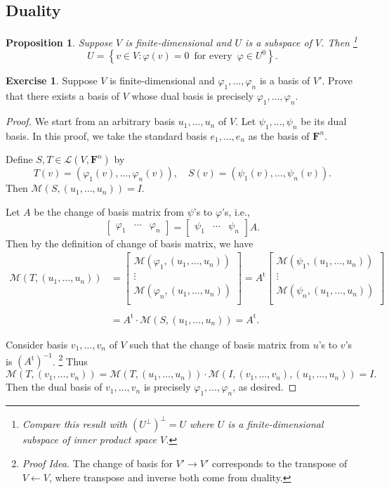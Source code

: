 \documentclass[nofonts,colorlinks]{tufte-handout}
\theoremstyle{plain} %
\newtheorem{prop}[thm]{Proposition}
\theoremstyle{definition}
\newtheorem{exer}[thm]{Exercise}
\theoremstyle{remark}
\def\idea{\textit{\color[rgb]{0,0,.55}Proof Idea. }}
\newcommand{\bra}[1]{\mathopen{}\left(#1\right)}
\newcommand{\cbra}[1]{\mathopen{}\left\{#1\right\}}
\renewcommand{\phi}{\varphi}
\newcommand{\F}{\mathbf{F}}
\renewcommand{\L}{\mathcal{L}}
\newcommand{\M}{\mathcal{M}}
\renewcommand{\intercal}{\mathrm{t}}
\begin{document}
\subsection{Duality}
\begin{prop}\label{prop: relation between subspace and annihilator}
	Suppose $V$ is finite-dimensional and $U$ is a subspace of $V$. Then%
	\footnote{Compare this result with $\bra{U^\perp}^\perp=U$ where $U$ is a finite-dimensional subspace of inner product space $V$.}
	\[U=\cbra{v\in V:\phi(v)=0\,\text{ for every }\,\phi\in U^0}.\]
\end{prop}

\begin{exer}
	Suppose $V$ is finite-dimensional and $\phi_1,\dots,\phi_n$ is a basis of $V'$. Prove that there exists a basis of $V$ whose dual basis is precisely $\phi_1,\dots,\phi_n$.
\end{exer}
\begin{proof}
	We start from an arbitrary basis $u_1,\dots,u_n$ of $V$. Let $\psi_1,\dots,\psi_n$ be its dual basis. In this proof, we take the standard basis $e_1,\dots,e_n$ as the basis of $\F^n$.
	
	Define $S,T\in\L\bra{V,\F^n}$ by
	\[T(v)=\bra{\phi_1(v),\dots,\phi_n(v)},\quad S(v)=\bra{\psi_1(v),\dots,\psi_n(v)}.\]
	Then $\M\bra{S,\bra{u_1,\dots,u_n}}=I$.
	
	Let $A$ be the change of basis matrix from $\psi$'s to $\phi$'s, i.e.,
	\[\begin{bmatrix}\phi_1&\cdots&\phi_n\end{bmatrix}=\begin{bmatrix}\psi_1&\cdots&\psi_n\end{bmatrix}A.\]
	Then by the definition of change of basis matrix, we have
	\begin{align*}
		\M\bra{T,\bra{u_1,\dots,u_n}}&=\begin{bmatrix}
			\M\bra{\phi_1,\bra{u_1,\dots,u_n}}\\
			\vdots\\
			\M\bra{\phi_n,\bra{u_1,\dots,u_n}}\\
		\end{bmatrix}
		=A^\intercal\begin{bmatrix}
			\M\bra{\psi_1,\bra{u_1,\dots,u_n}}\\
			\vdots\\
			\M\bra{\psi_n,\bra{u_1,\dots,u_n}}\\
		\end{bmatrix}\\\\
		&=A^\intercal\cdot\M\bra{S,\bra{u_1,\dots,u_n}}=A^\intercal.
	\end{align*}

	Consider basis $v_1,\dots,v_n$ of $V$ such that the change of basis matrix from $u$'s to $v$'s is $\bra{A^\intercal}^{-1}$.%
    \footnote{\idea The change of basis for $V'\to V'$ corresponds to the transpose of $V\leftarrow V$, where transpose and inverse both come from duality.}
	Thus
	\[\M\bra{T,\bra{v_1,\dots,v_n}}=\M\bra{T,\bra{u_1,\dots,u_n}}\cdot\M\bra{I,\bra{v_1,\dots,v_n},\bra{u_1,\dots,u_n}}=I.\]
	Then the dual basis of $v_1,\dots,v_n$ is precisely $\phi_1,\dots,\phi_n$, as desired.
\end{proof}
\end{document}
